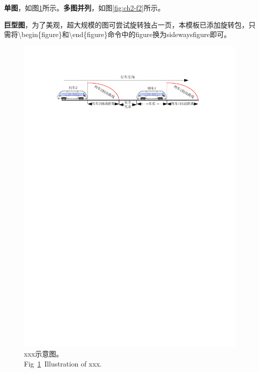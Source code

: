 \textbf{单图}，如图\ref{fig:ch2-f1}所示。\textbf{多图并列}，如图\ref{fig:ch2-f2}所示。

\textbf{巨型图}，为了美观，超大规模的图可尝试旋转独占一页，本模板已添加旋转包，只需将\textbackslash begin\{figure\}和\textbackslash end\{figure\}命令中的figure换为sidewaysfigure即可。

\begin{figure}[!htb]
	\centering
	\includegraphics[scale=0.95]{figures/ch2/figure1.pdf}
	\caption{xxx示意图。 \\Fig~\ref{fig:ch2-f1}~Illustration of xxx.}
	\label{fig:ch2-f1}
\end{figure}

\vspace{-2em}

